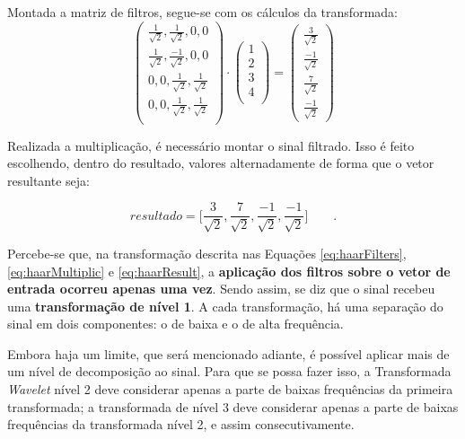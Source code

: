 			\par Montada a matriz de filtros, segue-se com os cálculos da transformada:
			\begin{equation}
				\begin{pmatrix}
					\frac{1}{\sqrt{2}}, \frac{1}{\sqrt{2}}, 0, 0\\
					\frac{1}{\sqrt{2}}, \frac{-1}{\sqrt{2}}, 0, 0\\
					0, 0, \frac{1}{\sqrt{2}}, \frac{1}{\sqrt{2}}\\
					0, 0, \frac{1}{\sqrt{2}}, \frac{1}{\sqrt{2}}\\
				\end{pmatrix} 
				\cdot
				\begin{pmatrix}
					1\\
					2\\
					3\\
					4\\
				\end{pmatrix} 
				=
				\begin{pmatrix}
					\frac{3}{\sqrt{2}}\\
					\frac{-1}{\sqrt{2}}\\
					\frac{7}{\sqrt{2}}\\
					\frac{-1}{\sqrt{2}}
				\end{pmatrix}
				\label{eq:haarMultiplic}
			\end{equation}

			\par Realizada a multiplicação, é necessário montar o sinal filtrado. Isso é feito escolhendo, dentro do resultado, valores alternadamente de forma que o vetor resultante seja:
			
			\begin{equation}
				resultado = \Big[
				\frac{3}{\sqrt{2}},
				\frac{7}{\sqrt{2}},
				\frac{-1}{\sqrt{2}},
				\frac{-1}{\sqrt{2}}
				\Big]\qquad.
				\label{eq:haarResult}
			\end{equation}
			
			\par Percebe-se que, na transformação descrita nas Equações \ref{eq:haarFilters}, \ref{eq:haarMultiplic} e \ref{eq:haarResult}, a \textbf{aplicação dos filtros sobre o vetor de entrada ocorreu apenas uma vez}. Sendo assim, se diz que o sinal recebeu uma \textbf{transformação de nível 1}. A cada transformação, há uma separação do sinal em dois componentes: o de baixa e o de alta frequência.
	
			\par Embora haja um limite, que será mencionado adiante, é possível aplicar mais de um nível de decomposição ao sinal. Para que se possa fazer isso, a Transformada \textit{Wavelet} nível 2 deve considerar apenas a parte de baixas frequências da primeira transformada; a transformada de nível 3 deve considerar apenas a parte de baixas frequências da transformada nível 2, e assim consecutivamente.
			
